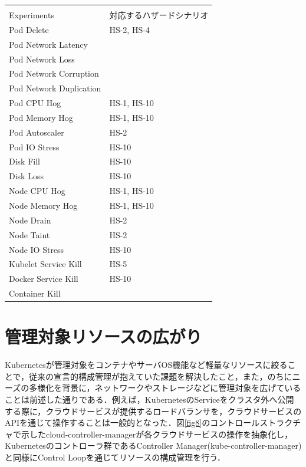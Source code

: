 \documentclass[12pt,a4j]{ujreport}
\begin{document}
\newpage
\begin{footnotesize}
    \begin{tabularx}{\linewidth}{
            >{\hsize=1.0\hsize}X|
            >{\hsize=1.0\hsize}X
        }
        \captionsetup{font=normalsize}
        \caption{Litmus ChaosのExprtiment一覧とハザードシナリオとの対応}\label{table9} \\
        Experiments           & 対応するハザードシナリオ        \\ \hline \hline
        Pod Delete	& HS-2, HS-4 \\ \hline
        Pod Network Latency	& \\ \hline
        Pod Network Loss & \\ \hline
        Pod Network Corruption & \\ \hline
        Pod Network Duplication & \\ \hline
        Pod CPU Hog & 	HS-1, HS-10 \\ \hline
        Pod Memory Hog	&  HS-1, HS-10 \\ \hline
        Pod Autoscaler	& HS-2 \\ \hline
        Pod IO Stress	& HS-10 \\ \hline
        Disk Fill	& HS-10 \\ \hline
        Disk Loss	& HS-10 \\ \hline
        Node CPU Hog	& HS-1, HS-10 \\ \hline
        Node Memory Hog	& HS-1, HS-10 \\ \hline
        Node Drain	& HS-2 \\ \hline
        Node Taint	& HS-2 \\ \hline
        Node IO Stress	& HS-10 \\ \hline
        Kubelet Service Kill	& HS-5 \\ \hline
        Docker Service Kill	& HS-10 \\ \hline
        Container Kill &  \\ \hline

    \end{tabularx}
\end{footnotesize}

\section{管理対象リソースの広がり}
Kubernetesが管理対象をコンテナやサーバOS機能など軽量なリソースに絞ることで，従来の宣言的構成管理が抱えていた課題を解決したこと，また，のちにニーズの多様化を背景に，ネットワークやストレージなどに管理対象を広げていることは前述した通りである．例えば，KubernetesのServiceをクラスタ外へ公開する際に，クラウドサービスが提供するロードバランサを，クラウドサービスのAPIを通じて操作することは一般的となった\cite{ref48}．図\ref{fig8}のコントロールストラクチャで示したcloud-controller-managerが各クラウドサービスの操作を抽象化し，Kubernetesのコントローラ群であるController Manager(kube-controller-manager)と同様にControl Loopを通じてリソースの構成管理を行う．
\end{document}
